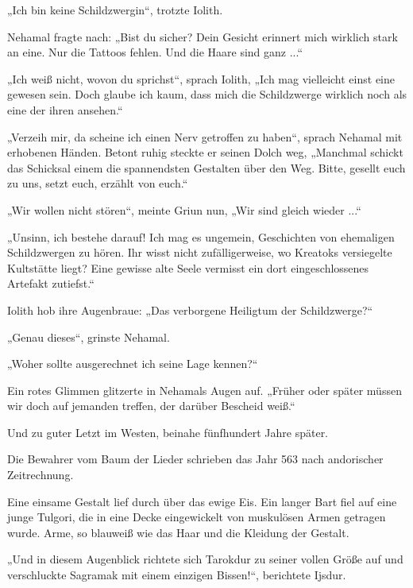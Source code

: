 „Ich bin keine Schildzwergin“, trotzte Iolith.

Nehamal fragte nach: „Bist du sicher? Dein Gesicht erinnert mich wirklich stark an eine. Nur die Tattoos fehlen. Und die Haare sind ganz ...“

„Ich weiß nicht, wovon du sprichst“, sprach Iolith, „Ich mag vielleicht einst eine gewesen sein. Doch glaube ich kaum, dass mich die Schildzwerge wirklich noch als eine der ihren ansehen.“

„Verzeih mir, da scheine ich einen Nerv getroffen zu haben“, sprach Nehamal mit erhobenen Händen. Betont ruhig steckte er seinen Dolch weg, „Manchmal schickt das Schicksal einem die spannendsten Gestalten über den Weg. Bitte, gesellt euch zu uns, setzt euch, erzählt von euch.“

„Wir wollen nicht stören“, meinte Griun nun, „Wir sind gleich wieder ...“

„Unsinn, ich bestehe darauf! Ich mag es ungemein, Geschichten von ehemaligen Schildzwergen zu hören. Ihr wisst nicht zufälligerweise, wo Kreatoks versiegelte Kultstätte liegt? Eine gewisse alte Seele vermisst ein dort eingeschlossenes Artefakt zutiefst.“

Iolith hob ihre Augenbraue: „Das verborgene Heiligtum der Schildzwerge?“

„Genau dieses“, grinste Nehamal.

„Woher sollte ausgerechnet ich seine Lage kennen?“

Ein rotes Glimmen glitzerte in Nehamals Augen auf. „Früher oder später müssen wir doch auf jemanden treffen, der darüber Bescheid weiß.“\bigskip








Und zu guter Letzt im Westen, beinahe fünfhundert Jahre später.\bigskip



Die Bewahrer vom Baum der Lieder schrieben das Jahr 563 nach andorischer Zeitrechnung.

Eine einsame Gestalt lief durch über das ewige Eis. Ein langer Bart fiel auf eine junge Tulgori, die in eine Decke eingewickelt von muskulösen Armen getragen wurde. Arme, so blauweiß wie das Haar und die Kleidung der Gestalt.

„Und in diesem Augenblick richtete sich Tarokdur zu seiner vollen Größe auf und verschluckte Sagramak mit einem einzigen Bissen!“, berichtete Ijsdur.

